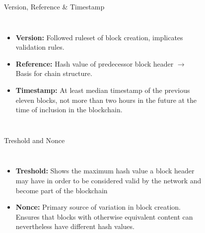 \documentclass[]{beamer}
\begin{document}
\begin{frame}{Version, Reference \& Timestamp}
	\begin{columns}
		\begin{itemize}
			\item \textbf{Version:} Followed ruleset of block creation, implicates validation rules.
			\item \textbf{Reference:} Hash value of predecessor block header $\rightarrow$ Basis for chain structure.
			\item \textbf{Timestamp:} At least median timestamp of the previous eleven blocks, not more than two hours in the future at the time of inclusion in the blockchain. 
		\end{itemize}
		\begin{figure}
			
		\end{figure}
	\end{columns}
\end{frame}


\begin{frame}{Treshold and Nonce}
	\begin{columns}
	\column{0.7\textwidth}
		\begin{itemize}
			\item \textbf{Treshold:} Shows the maximum hash value a block header may have in order to be considered valid by the network and become part of the blockchain
			\item \textbf{Nonce:} Primary source of variation in block creation. Ensures that blocks with otherwise equivalent content can nevertheless have different hash values.
		\end{itemize}
	\column{0.3\textwidth}
		\begin{figure}
			
		\end{figure}
	\end{columns}
\end{frame}
\end{document}
